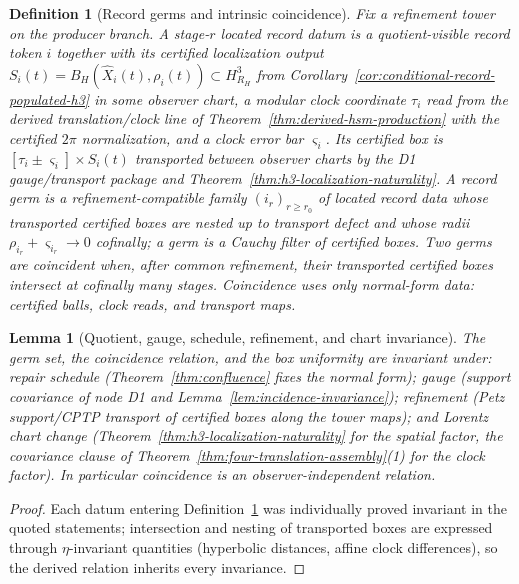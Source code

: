 \documentclass[11pt]{article}
\newtheorem{lemma}[theorem]{Lemma}
\newtheorem{definition}[theorem]{Definition}
\begin{document}
\begin{definition}[Record germs and intrinsic coincidence]
\label{def:record-coincidence}
Fix a refinement tower on the producer branch. A stage-\(r\) \emph{located
record datum} is a quotient-visible record token \(i\) together with its
certified localization output
\(S_{i}(t)=B_H(\widehat X_i(t),\rho_i(t))\subset H^3_{R_H}\) from
Corollary~\ref{cor:conditional-record-populated-h3} in some observer chart, a
modular clock coordinate \(\tau_i\) read from the derived translation/clock
line of Theorem~\ref{thm:derived-hsm-production} with the certified \(2\pi\)
normalization, and a clock error bar \(\varsigma_i\). Its \emph{certified box}
is \([\tau_i\pm\varsigma_i]\times S_i(t)\) transported between observer charts
by the D1 gauge/transport package and
Theorem~\ref{thm:h3-localization-naturality}. A \emph{record germ} is a
refinement-compatible family \((i_r)_{r\geq r_0}\) of located record data
whose transported certified boxes are nested up to transport defect and whose
radii \(\rho_{i_r}+\varsigma_{i_r}\to0\) cofinally; a germ is a Cauchy filter
of certified boxes. Two germs are \emph{coincident} when, after common
refinement, their transported certified boxes intersect at cofinally many
stages. Coincidence uses only normal-form data: certified balls, clock reads,
and transport maps.
\end{definition}

\begin{lemma}[Quotient, gauge, schedule, refinement, and chart invariance]
\label{lem:event-quotient-invariance}
The germ set, the coincidence relation, and the box uniformity are invariant
under: repair schedule (Theorem~\ref{thm:confluence} fixes the normal form);
gauge (support covariance of node D1 and
Lemma~\ref{lem:incidence-invariance}); refinement (Petz support/CPTP transport
of certified boxes along the tower maps); and Lorentz chart change
(Theorem~\ref{thm:h3-localization-naturality} for the spatial factor, the
covariance clause of Theorem~\ref{thm:four-translation-assembly}(1) for the
clock factor). In particular coincidence is an observer-independent relation.
\end{lemma}

\begin{proof}
Each datum entering Definition~\ref{def:record-coincidence} was individually
proved invariant in the quoted statements; intersection and nesting of
transported boxes are expressed through \(\eta\)-invariant quantities
(hyperbolic distances, affine clock differences), so the derived relation
inherits every invariance.
\end{proof}
\end{document}
